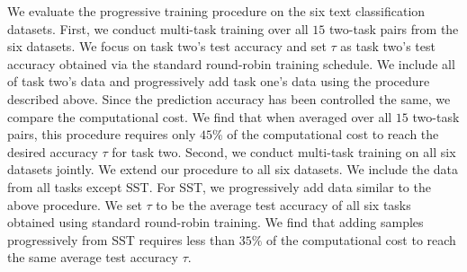 We evaluate the progressive training procedure on the six text classification datasets.
First, we conduct multi-task training over all $15$ two-task pairs from the six datasets.
We focus on task two's test accuracy and set $\tau$ as task two's test accuracy obtained via the standard round-robin training schedule.
We include all of task two's data and progressively add task one's data using the procedure described above.
Since the prediction accuracy has been controlled the same, we compare the computational cost.
We find that when averaged over all $15$ two-task pairs, this procedure requires only $45\%$ of the computational cost to reach the desired accuracy $\tau$ for task two.
Second, we conduct multi-task training on all six datasets jointly.
We extend our procedure to all six datasets. We include the data from all tasks except SST. For SST, we progressively add data similar to the above procedure.
We set $\tau$ to be the average test accuracy of all six tasks obtained using standard round-robin training.
We find that adding samples progressively from SST requires less than $35\%$ of the computational cost to reach the same average test accuracy $\tau$.




